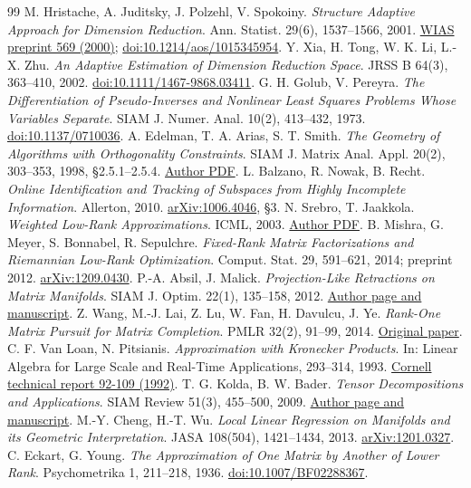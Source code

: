 \documentclass[11pt,a4paper]{article}
\begin{document}
\begin{thebibliography}{99}\small
{} M. Hristache, A. Juditsky, J. Polzehl, V. Spokoiny.
\emph{Structure Adaptive Approach for Dimension Reduction}.
Ann. Statist. 29(6), 1537--1566, 2001.
\href{https://www.wias-berlin.de/preprint/569/wias_preprints_569.pdf}{WIAS preprint 569 (2000)};
\href{https://doi.org/10.1214/aos/1015345954}{doi:10.1214/aos/1015345954}.
 Y. Xia, H. Tong, W. K. Li, L.-X. Zhu.
\emph{An Adaptive Estimation of Dimension Reduction Space}.
JRSS B 64(3), 363--410, 2002.
\href{https://doi.org/10.1111/1467-9868.03411}{doi:10.1111/1467-9868.03411}.
 G. H. Golub, V. Pereyra.
\emph{The Differentiation of Pseudo-Inverses and Nonlinear Least Squares
Problems Whose Variables Separate}. SIAM J. Numer. Anal. 10(2), 413--432, 1973.
\href{https://doi.org/10.1137/0710036}{doi:10.1137/0710036}.
 A. Edelman, T. A. Arias, S. T. Smith.
\emph{The Geometry of Algorithms with Orthogonality Constraints}.
SIAM J. Matrix Anal. Appl. 20(2), 303--353, 1998, \S2.5.1--2.5.4.
\href{https://math.mit.edu/~edelman/publications/geometry_of_algorithms.pdf}{Author PDF}.
 L. Balzano, R. Nowak, B. Recht.
\emph{Online Identification and Tracking of Subspaces from Highly Incomplete
Information}. Allerton, 2010.
\href{https://arxiv.org/abs/1006.4046}{arXiv:1006.4046}, \S3.
 N. Srebro, T. Jaakkola.
\emph{Weighted Low-Rank Approximations}. ICML, 2003.
\href{https://people.csail.mit.edu/tommi/papers/SreJaa-icml03.pdf}{Author PDF}.
 B. Mishra, G. Meyer, S. Bonnabel, R. Sepulchre.
\emph{Fixed-Rank Matrix Factorizations and Riemannian Low-Rank Optimization}.
Comput. Stat. 29, 591--621, 2014; preprint 2012.
\href{https://arxiv.org/abs/1209.0430}{arXiv:1209.0430}.
 P.-A. Absil, J. Malick.
\emph{Projection-Like Retractions on Matrix Manifolds}.
SIAM J. Optim. 22(1), 135--158, 2012.
\href{https://sites.uclouvain.be/absil/2010.038}{Author page and manuscript}.
 Z. Wang, M.-J. Lai, Z. Lu, W. Fan, H. Davulcu, J. Ye.
\emph{Rank-One Matrix Pursuit for Matrix Completion}.
PMLR 32(2), 91--99, 2014.
\href{https://proceedings.mlr.press/v32/wanga14.html}{Original paper}.
 C. F. Van Loan, N. Pitsianis.
\emph{Approximation with Kronecker Products}.
In: Linear Algebra for Large Scale and Real-Time Applications, 293--314, 1993.
\href{https://ecommons.cornell.edu/entities/publication/ad6a5c71-2632-4652-b33a-72016d7abc4d}{Cornell technical report 92-109 (1992)}.
 T. G. Kolda, B. W. Bader.
\emph{Tensor Decompositions and Applications}.
SIAM Review 51(3), 455--500, 2009.
\href{https://www.kolda.net/publication/koba09/}{Author page and manuscript}.
 M.-Y. Cheng, H.-T. Wu.
\emph{Local Linear Regression on Manifolds and its Geometric Interpretation}.
JASA 108(504), 1421--1434, 2013.
\href{https://arxiv.org/abs/1201.0327}{arXiv:1201.0327}.
 C. Eckart, G. Young.
\emph{The Approximation of One Matrix by Another of Lower Rank}.
Psychometrika 1, 211--218, 1936.
\href{https://doi.org/10.1007/BF02288367}{doi:10.1007/BF02288367}.
\end{thebibliography}
\end{document}
